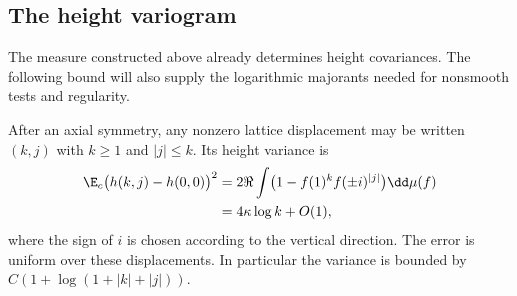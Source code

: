 \subsection{The height variogram}

The measure constructed above already determines height covariances.
The following bound will also supply the logarithmic majorants needed
for nonsmooth tests and regularity.

\begin{proposition}
\label{prop:variogram}
After an axial symmetry, any nonzero lattice displacement may be
written $(k,j)$ with $k\ge1$ and $|j|\le k$.  Its height variance is
\begin{equation}\label{eq:angular-variogram}
 \begin{aligned}
 \E_c\bigl(h(k,j)-h(0,0)\bigr)^2
 &=2\Re\int\bigl(1-f(1)^k f(\pm i)^{|j|}\bigr)\dd\mu(f)\\
 &=4\kappa\log k+O(1),
 \end{aligned}
\end{equation}
where the sign of $i$ is chosen according to the vertical direction.
The error is uniform over these displacements.  In particular the
variance is bounded by $C(1+\log(1+|k|+|j|))$.
\end{proposition}

